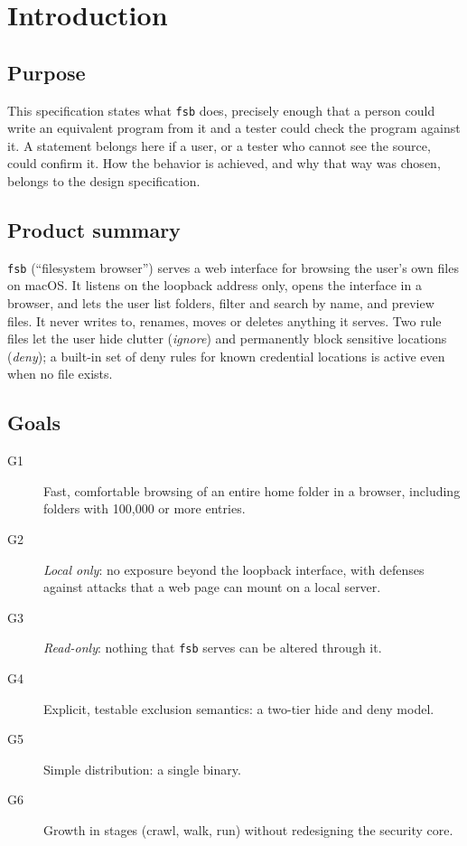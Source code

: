 \section{Introduction}

\subsection{Purpose}

This specification states what \texttt{fsb} does, precisely enough that a person
could write an equivalent program from it and a tester could check the program
against it.  A statement belongs here if a user, or a tester who cannot see the
source, could confirm it.  How the behavior is achieved, and why that way was
chosen, belongs to the design specification.

\subsection{Product summary}

\texttt{fsb} (``filesystem browser'') serves a web interface for browsing the
user's own files on macOS.
It listens on the loopback address only, opens the interface in a browser, and
lets the user list folders, filter and search by name, and preview files.  It
never writes to, renames, moves or deletes anything it serves.  Two rule files let
the user hide clutter (\emph{ignore}) and permanently block sensitive locations
(\emph{deny}); a built-in set of deny rules for known credential locations is
active even when no file exists.

\subsection{Goals}

\begin{description}
  \item[G1] Fast, comfortable browsing of an entire home folder in a browser,
        including folders with 100{,}000 or more entries.
  \item[G2] \emph{Local only}: no exposure beyond the loopback interface, with
        defenses against attacks that a web page can mount on a local server.
  \item[G3] \emph{Read-only}: nothing that \texttt{fsb} serves can be altered
        through it.
  \item[G4] Explicit, testable exclusion semantics: a two-tier hide and deny model.
  \item[G5] Simple distribution: a single binary.
  \item[G6] Growth in stages (crawl, walk, run) without redesigning the security
        core.
\end{description}

